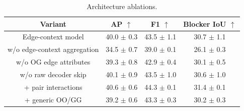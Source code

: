\begin{table}[htbp]
  \centering
  \caption{Architecture ablations.}
  \label{tab:stage2_architecture_ablation}
  \small
  \setlength{\tabcolsep}{4.5pt}
  \begin{tabular}{cccc}
    \toprule
    Variant & AP $\uparrow$ & F1 $\uparrow$ & Blocker IoU $\uparrow$ \\
    \midrule
    Edge-context model & 40.0 $\pm$ 0.3 & 43.5 $\pm$ 1.1 & 30.7 $\pm$ 1.1 \\
    w/o edge-context aggregation & 34.5 $\pm$ 0.7 & 39.0 $\pm$ 0.1 & 26.1 $\pm$ 0.3 \\
    w/o OG edge attributes & 39.3 $\pm$ 0.8 & 42.9 $\pm$ 0.4 & 30.1 $\pm$ 0.5 \\
    w/o raw decoder skip & 40.1 $\pm$ 0.9 & 43.5 $\pm$ 1.0 & 30.6 $\pm$ 1.0 \\
    + pair interactions & 40.6 $\pm$ 0.6 & 44.3 $\pm$ 0.1 & 31.4 $\pm$ 0.1 \\
    + generic OO/GG & 39.2 $\pm$ 0.6 & 43.3 $\pm$ 0.3 & 30.2 $\pm$ 0.3 \\
    \bottomrule
  \end{tabular}
  \vspace{2pt}
\end{table}
